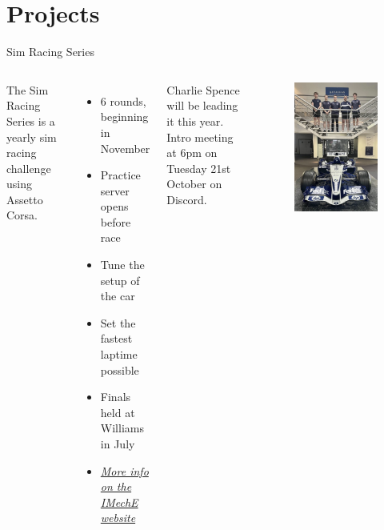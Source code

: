 \section*{Projects}
\begin{frame}{Sim Racing Series}
    \begin{columns}
        The Sim Racing Series is a yearly
        sim racing challenge using Assetto Corsa.
        \begin{itemize}
            \item 6 rounds, beginning in November
            \item Practice server opens before race
            \item Tune the setup of the car
            \item Set the fastest laptime possible
            \item Finals held at Williams in July
            \item \href{https://www.imeche.org/events/formula-student/team-information/fs-sim-racing}{\textit{More info on the IMechE website}}
        \end{itemize}
        Charlie Spence will be leading it this year.
        Intro meeting at 6pm on Tuesday 21st October on Discord.
        \begin{figure}
            \includegraphics[width=\textwidth]{res/Williams Sim Racing.png}

\end{figure}
\end{columns}
\end{frame}
